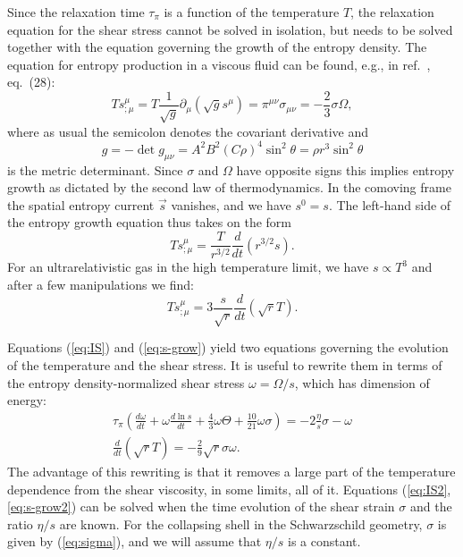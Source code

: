\documentclass[article,twocolumn]{revtex4}
\newcommand{\be}{\begin{equation}}
\newcommand{\ee}{\end{equation}}
\newcommand{\ba}{\begin{eqnarray}}
\newcommand{\ea}{\end{eqnarray}}
\begin{document}
Since the relaxation time $\tau_{\pi}$ is a function of the temperature $T$, the relaxation equation for the shear stress cannot be solved in isolation, but needs to be solved together with the equation governing the growth of the entropy density. The equation for entropy production in a viscous fluid can be found, e.g., in ref.~\cite{Heinz:2005zi}, eq.~(28):
\be
T s^\mu_{;\mu} = T \frac{1}{\sqrt{g}} \partial_\mu (\sqrt{g} s^\mu) = \pi^{\mu\nu} \sigma_{\mu\nu} 
= - \frac{2}{3} \sigma \Omega ,
\label{eq:ds/dt}
\ee
where as usual the semicolon denotes the covariant derivative and 
\be 
g = -\det g_{\mu\nu} = A^2B^2(C\rho)^4\sin^2\theta = \rho r^3 \sin^2\theta
\ee
is the metric determinant. Since $\sigma$ and $\Omega$ have opposite signs this implies entropy growth as dictated by the second law of thermodynamics.  In the comoving frame the spatial entropy current $\vec{s}$ vanishes, and we have $s^0=s$. The left-hand side of the entropy growth equation thus takes on the form
\be
T s^\mu_{;\mu} = \frac{T}{r^{3/2}} \frac{d}{dt} \left( r^{3/2} s \right) .
\ee
For an ultrarelativistic gas in the high temperature limit, we have $s \propto T^3$ and after a few manipulations we find:
\be
T s^\mu_{;\mu} = 3 \frac{s}{\sqrt{r}} \frac{d}{dt} \left( \sqrt{r} T \right) .
\label{eq:s-grow}
\ee

Equations (\ref{eq:IS}) and (\ref{eq:s-grow}) yield two equations governing the evolution of the temperature and the shear stress. It is useful to rewrite them in terms of the entropy density-normalized shear stress $\omega = \Omega/s$, which has dimension of energy:
\ba
\tau_{\pi} \left( \frac{d\omega}{dt} + \omega \frac{d \ln s}{dt} + \frac{4}{3} \omega\Theta +\frac{10}{21} \omega \sigma \right)
= - 2 \frac{\eta}{s} \sigma - \omega
\label{eq:IS2}
\\
\frac{d}{dt} \left( \sqrt{r} T \right) = - \frac{2}{9} \sqrt{r} \sigma \omega .
\label{eq:s-grow2}
\ea
The advantage of this rewriting is that it removes a large part of the temperature dependence from the shear viscosity, in some limits, all of it. Equations (\ref{eq:IS2}, \ref{eq:s-grow2}) can be solved when the time evolution of the shear strain $\sigma$ and the ratio $\eta/s$ are known. For the collapsing shell in the Schwarzschild geometry, $\sigma$ is given by (\ref{eq:sigma}), and we will assume that $\eta/s$ is a constant. 
\end{document}
